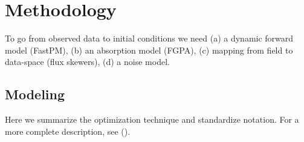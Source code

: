 \documentclass[times]{aastex62}
\begin{document}
\section{Methodology}
\label{sec:method}
To go from observed data to initial conditions we need (a) a dynamic forward model (FastPM), (b) an absorption model (FGPA), (c) mapping from field to data-space (flux skewers), (d) a noise model.

\subsection{Modeling}

Here we summarize the optimization technique and standardize notation. For a more complete description, see (\cite{seljak1998cosmography,2009simon,seljak2017towards,2018Horowitz}).
\end{document}
